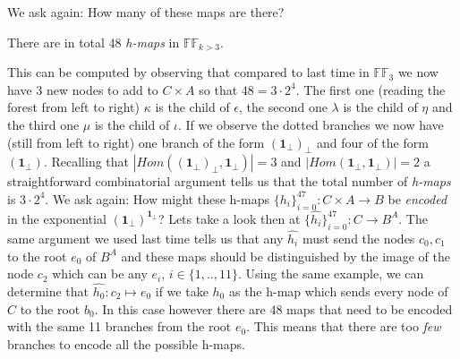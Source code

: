 We ask again: How many of these maps are there?
\begin{lem}
There are in total 48 \emph{h-maps} in $\mathbb{FF}_{k > 3}$. 
\end{lem}

This can be computed by observing that compared to last time in $\mathbb{FF}_3$ we now have 3 new nodes to add to $C \times A$ so that $48=3 \cdot 2^4$.
\newline
The first one (reading the forest from left to right) $\kappa$ is the child of $\epsilon$, the second one $\lambda$ is the child of $\eta$ and the third one $\mu$ is the child of $\iota$.
If we observe the dotted branches we now have (still from left to right) one branch of the form $(\textbf{1}_\bot)_\bot$ and four of the form $(\textbf{1}_\bot)$. 
\newline
Recalling that $| Hom((\textbf{1}_\bot)_\bot, \textbf{1}_\bot) | =3$ and $| Hom(\textbf{1}_\bot, \textbf{1}_\bot) | =2$
a straightforward combinatorial argument tells us that the total number of \emph{h-maps} is $3 \cdot 2^4$.
\newline
 We ask again:
 How might these h-maps $\{h_i\}_{i=0}^{47} : C \times A \rightarrow B$ be \emph{encoded} in the exponential $(\textbf{1}_\bot)^{\textbf{1}_\bot}$?  \newline\newline
Lets take a look then at $\{\hat{h_i}\}_{i=0}^{47} : C \rightarrow B^A$. 
 \newline
The same argument we used last time tells us that any $\hat{h_i}$ must send the nodes $c_0,c_1$ to the root $e_0$ of $B^A$ and these maps should be distinguished by the image of the node $c_2$ which can be any $e_i$, $i \in \{1,..,11\}$.
 \newline
  Using the same example, we can determine that  $\hat{h_0}: c_2 \mapsto e_0$ if we take $h_0$ as the h-map which sends every node of $C$ to the root $b_0$.
  \newline
  In this case however there are 48 maps that need to be encoded with the same 11 branches from the root $e_0$.
   \newline
  This means that there are too \emph{few} branches to encode all the possible h-maps.
  
